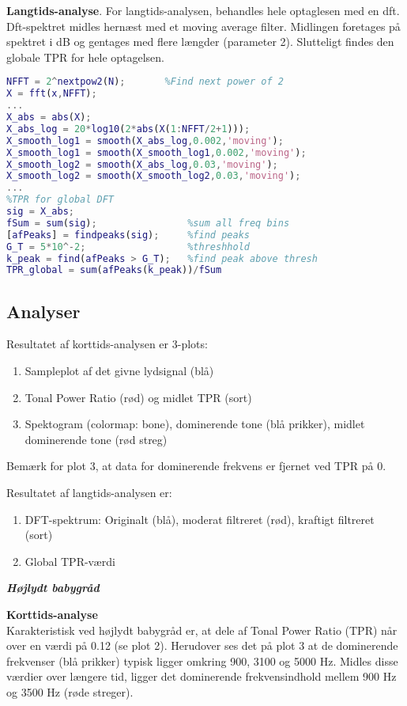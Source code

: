 \textbf{Langtids-analyse}. For langtids-analysen, behandles hele optaglesen med en dft. Dft-spektret midles hernæst med et moving average filter. Midlingen foretages på spektret i dB og gentages med flere længder (parameter 2). Slutteligt findes den globale TPR for hele optagelsen. 

\begin{lstlisting}[language=Matlab]
%**** FAST FOURIER TRANSFORM *********************************** 
NFFT = 2^nextpow2(N);       %Find next power of 2
X = fft(x,NFFT);
...
X_abs = abs(X);
X_abs_log = 20*log10(2*abs(X(1:NFFT/2+1)));
X_smooth_log1 = smooth(X_abs_log,0.002,'moving');
X_smooth_log1 = smooth(X_smooth_log1,0.002,'moving'); 
X_smooth_log2 = smooth(X_abs_log,0.03,'moving');       
X_smooth_log2 = smooth(X_smooth_log2,0.03,'moving');
...
%TPR for global DFT
sig = X_abs;
fSum = sum(sig);                %sum all freq bins
[afPeaks] = findpeaks(sig);     %find peaks
G_T = 5*10^-2;                  %threshhold
k_peak = find(afPeaks > G_T);   %find peak above thresh
TPR_global = sum(afPeaks(k_peak))/fSum 
\end{lstlisting}

\newpage
\subsection*{Analyser}
Resultatet af korttids-analysen er 3-plots:
\begin{enumerate}
	\item Sampleplot af det givne lydsignal (blå)
	\item Tonal Power Ratio (rød) og midlet TPR (sort)
	\item Spektogram (colormap: bone), dominerende tone (blå prikker), midlet dominerende tone (rød streg)
\end{enumerate}
Bemærk for plot 3, at data for dominerende frekvens er fjernet ved TPR på 0.

Resultatet af langtids-analysen er:
\begin{enumerate}
	\item DFT-spektrum: Originalt (blå), moderat filtreret (rød), kraftigt filtreret (sort)
	\item Global TPR-værdi
\end{enumerate}

\newpage
\begin{center}  \textit{\textbf{Højlydt babygråd}}  \end{center}
\textbf{Korttids-analyse} \\
Karakteristisk ved højlydt babygråd er, at dele af Tonal Power Ratio (TPR) når over en værdi på 0.12 (se plot 2). Herudover ses det på plot 3 at de dominerende frekvenser (blå prikker) typisk ligger omkring 900, 3100 og 5000 Hz. Midles disse værdier over længere tid, ligger det dominerende frekvensindhold mellem 900 Hz og 3500 Hz (røde streger). 

